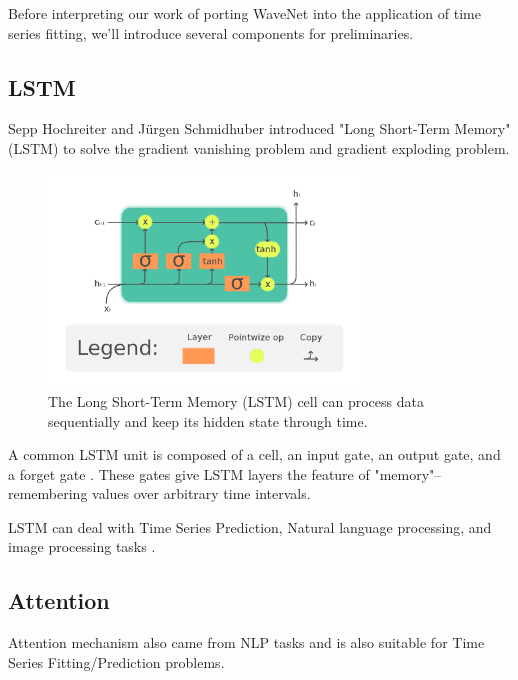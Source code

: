 Before interpreting our work of porting WaveNet into the application of time series fitting, we'll introduce several components for preliminaries.

\subsection{LSTM}

Sepp Hochreiter and Jürgen Schmidhuber \cite{hochreiter1997long} introduced "Long Short-Term Memory" (LSTM) to solve the gradient vanishing problem and gradient exploding problem.

\begin{figure}[!htbp]
    \centering
    \includegraphics[width=8.3cm]{fig/Survey/The_LSTM_Cell.png}
    \caption{The Long Short-Term Memory (LSTM) cell can process data sequentially and keep its hidden state through time. \cite{wiki:LSTM}}
    \label{fig:The_LSTM_Cell}
\end{figure}

A common LSTM unit is composed of a cell, an input gate, an output gate, and a forget gate \cite{wiki:LSTM}. These gates give LSTM layers the feature of "memory"--remembering values over arbitrary time intervals.

LSTM can deal with Time Series Prediction, Natural language processing, and image processing tasks \cite{lindemann2021survey}.


\subsection{Attention}

Attention mechanism also came from NLP tasks and is also suitable for Time Series Fitting/Prediction problems.

